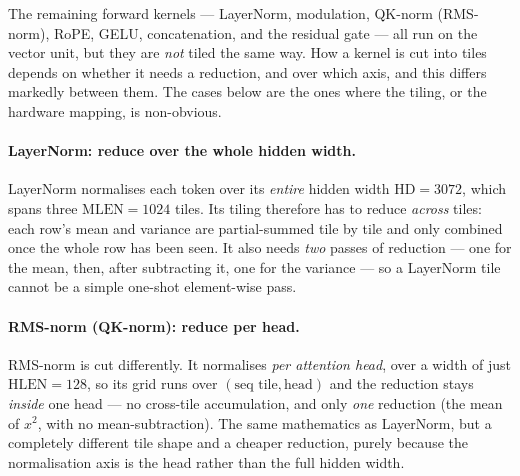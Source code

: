\documentclass[11pt]{report}
\begin{document}
The remaining forward kernels --- LayerNorm, modulation, QK-norm (RMS-norm),
RoPE, GELU, concatenation, and the residual gate --- all run on the vector
unit, but they are \emph{not} tiled the same way. How a kernel is cut into
tiles depends on whether it needs a reduction, and over which axis, and
this differs markedly between them. The cases below are the ones where the
tiling, or the hardware mapping, is non-obvious.

\paragraph{LayerNorm: reduce over the whole hidden width.} LayerNorm
normalises each token over its \emph{entire} hidden width $\text{HD}=3072$,
which spans three $\text{MLEN}=1024$ tiles. Its tiling therefore has to
reduce \emph{across} tiles: each row's mean and variance are partial-summed
tile by tile and only combined once the whole row has been seen. It also
needs \emph{two} passes of reduction --- one for the mean, then, after
subtracting it, one for the variance --- so a LayerNorm tile cannot be a
simple one-shot element-wise pass.

\begin{algorithm}[H]
\DontPrintSemicolon
{}
\caption{LayerNorm: full-hidden-width reduction (two passes)}
\end{algorithm}

\paragraph{RMS-norm (QK-norm): reduce per head.} RMS-norm is cut
differently. It normalises \emph{per attention head}, over a width of just
$\text{HLEN}=128$, so its grid runs over $(\text{seq tile},\text{head})$ and
the reduction stays \emph{inside} one head --- no cross-tile accumulation,
and only \emph{one} reduction (the mean of $x^2$, with no mean-subtraction).
The same mathematics as LayerNorm, but a completely different tile shape and
a cheaper reduction, purely because the normalisation axis is the head
rather than the full hidden width.

\begin{algorithm}[H]
\DontPrintSemicolon
{}
\caption{RMS-norm (QK-norm): per-head reduction, single pass}
\end{algorithm}
\end{document}
